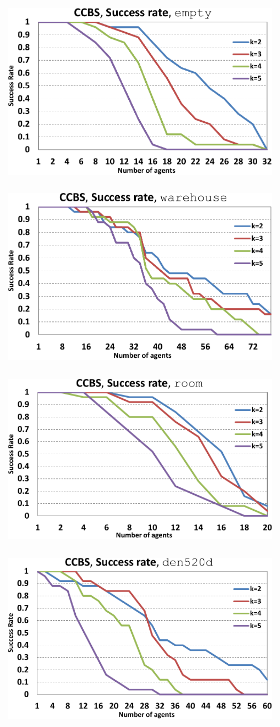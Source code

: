\documentclass[review]{elsarticle}
\begin{document}
\begin{figure}[t]
\centering
\begin{subfigure}
    \centering
    \begin{subfigure}
        \centering
        \includegraphics[width=0.45\linewidth]{mapfr-sr-plot-ccbs-empty.pdf}
    \end{subfigure}\hspace{0.025\linewidth}%
    \begin{subfigure}
        \centering
        \includegraphics[width=0.45\linewidth]{mapfr-sr-plot-ccbs-warehouse.pdf}
    \end{subfigure}
\end{subfigure}

\begin{subfigure}
    \centering
    \begin{subfigure}
        \centering
        \includegraphics[width=0.45\linewidth]{mapfr-sr-plot-ccbs-room.pdf}
    \end{subfigure}\hspace{0.025\linewidth}%
    \begin{subfigure}
        \centering
        \includegraphics[width=0.45\linewidth]{mapfr-sr-plot-ccbs-den520d.pdf}
    \end{subfigure}%
\end{subfigure}


\end{figure}
\end{document}
